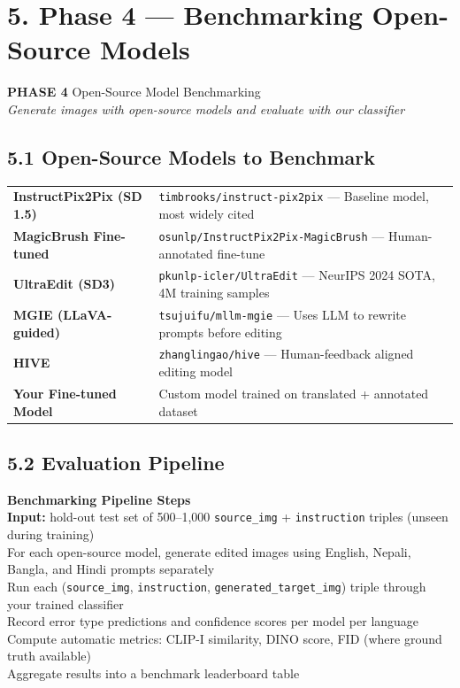 \documentclass[11pt,a4paper]{article}
\begin{document}
\section{5. Phase 4 — Benchmarking Open-Source Models}

\begin{phasebox}
\textbf{PHASE 4} \quad Open-Source Model Benchmarking\\
\textit{Generate images with open-source models and evaluate with our classifier}
\end{phasebox}

\subsection{5.1 Open-Source Models to Benchmark}

\begin{tabularx}{\textwidth}{>{\bfseries}lX}
\toprule
InstructPix2Pix (SD 1.5) & \texttt{timbrooks/instruct-pix2pix} — Baseline model, most widely cited \\
\rowcolor{lightgray}
MagicBrush Fine-tuned & \texttt{osunlp/InstructPix2Pix-MagicBrush} — Human-annotated fine-tune \\
UltraEdit (SD3) & \texttt{pkunlp-icler/UltraEdit} — NeurIPS 2024 SOTA, 4M training samples \\
\rowcolor{lightgray}
MGIE (LLaVA-guided) & \texttt{tsujuifu/mllm-mgie} — Uses LLM to rewrite prompts before editing \\
HIVE & \texttt{zhanglingao/hive} — Human-feedback aligned editing model \\
\rowcolor{lightgray}
Your Fine-tuned Model & Custom model trained on translated + annotated dataset \\
\bottomrule
\end{tabularx}

\subsection{5.2 Evaluation Pipeline}

\begin{infobox}
\textbf{Benchmarking Pipeline Steps}\\[4pt]
\textbf{Input:} hold-out test set of 500–1,000 \texttt{source\_img} + \texttt{instruction} triples (unseen during training)\\[4pt]
For each open-source model, generate edited images using English, Nepali, Bangla, and Hindi prompts separately\\[4pt]
Run each (\texttt{source\_img}, \texttt{instruction}, \texttt{generated\_target\_img}) triple through your trained classifier\\[4pt]
Record error type predictions and confidence scores per model per language\\[4pt]
Compute automatic metrics: CLIP-I similarity, DINO score, FID (where ground truth available)\\[4pt]
Aggregate results into a benchmark leaderboard table
\end{infobox}
\end{document}
